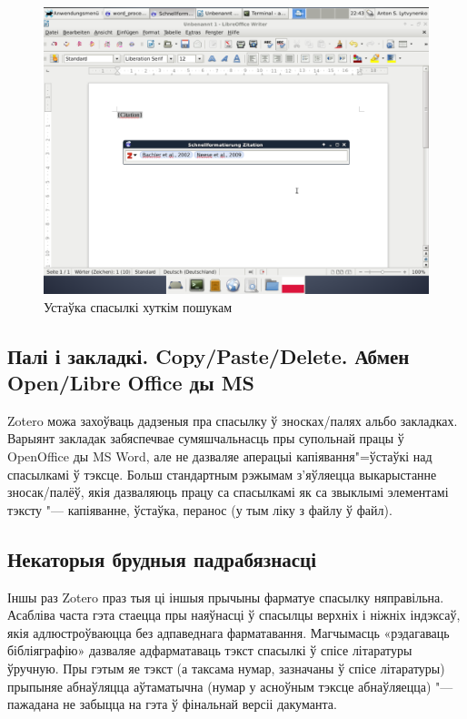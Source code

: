 \documentclass[10pt, a5paper]{article}
\begin{document}
\begin{figure}[h!]
  \centering
  \includegraphics[scale=0.2]{11_2014_Fig3.png}
  \caption{Устаўка спасылкі хуткім пошукам}
\end{figure}

\subsection*{Палі і закладкі. Copy/Paste/Delete. Абмен \linebreak Open/Libre Office ды MS}

Zotero можа захоўваць дадзеныя пра спасылку ў зносках/палях альбо закладках. Варыянт закладак забяспечвае сумяшчальнасць пры супольнай працы ў OpenOffice ды MS Word, але не дазваляе аперацыі капіявання"=ўстаўкі над спасылкамі ў тэксце. Больш стандартным рэжымам з’яўляецца выкарыстанне зносак/палёў, якія дазваляюць працу са спасылкамі як са звыклымі элементамі тэксту "--- капіяванне, ўстаўка, перанос (у тым ліку з файлу ў файл).

\subsection*{Некаторыя брудныя падрабязнасці}

Іншы раз Zotero праз тыя ці іншыя прычыны фарматуе спасылку няправільна. Асабліва часта гэта стаецца пры наяўнасці ў спасылцы верхніх і ніжніх індэксаў, якія адлюстроўваюцца без адпаведнага фарматавання. Магчымасць «рэдагаваць бібліяграфію» дазваляе адфарматаваць тэкст спасылкі ў спісе літаратуры ўручную. Пры гэтым яе тэкст (а таксама нумар, зазначаны ў спісе літаратуры) прыпыняе абнаўляцца аўтаматычна (нумар у асноўным тэксце абнаўляецца) "--- пажадана не забыцца на гэта ў фінальнай версіі дакуманта.
\end{document}
